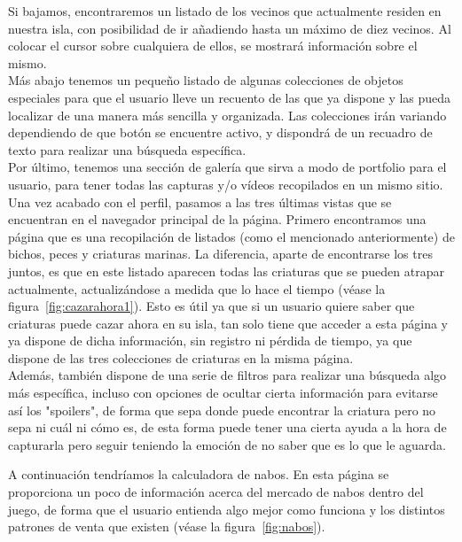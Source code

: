 Si bajamos, encontraremos un listado de los vecinos que actualmente residen en nuestra isla, con posibilidad de ir añadiendo hasta un máximo de diez vecinos. Al colocar el cursor sobre cualquiera de ellos, se mostrará información sobre el mismo.\\

Más abajo tenemos un pequeño listado de algunas colecciones de objetos especiales para que el usuario lleve un recuento de las que ya dispone y las pueda localizar de una manera más sencilla y organizada. Las colecciones irán variando dependiendo de que botón se encuentre activo, y dispondrá de un recuadro de texto para realizar una búsqueda específica.\\

Por último, tenemos una sección de galería que sirva a modo de portfolio para el usuario, para tener todas las capturas y/o vídeos recopilados en un mismo sitio.\\

Una vez acabado con el perfil, pasamos a las tres últimas vistas que se encuentran en el navegador principal de la página. Primero encontramos una página que es una recopilación de listados (como el mencionado anteriormente) de bichos, peces y criaturas marinas. La diferencia, aparte de encontrarse los tres juntos, es que en este listado aparecen todas las criaturas que se pueden atrapar actualmente, actualizándose a medida que lo hace el tiempo {(v\'ease la figura~\ref{fig:cazarahora1})}. Esto es útil ya que si un usuario quiere saber que criaturas puede cazar ahora en su isla, tan solo tiene que acceder a esta página y ya dispone de dicha información, sin registro ni pérdida de tiempo, ya que dispone de las tres colecciones de criaturas en la misma página.\\

Además, también dispone de una serie de filtros para realizar una búsqueda algo más específica, incluso con opciones de ocultar cierta información para evitarse así los "spoilers", de forma que sepa donde puede encontrar la criatura pero no sepa ni cuál ni cómo es, de esta forma puede tener una cierta ayuda a la hora de capturarla pero seguir teniendo la emoción de no saber que es lo que le aguarda.\\



A continuación tendríamos la calculadora de nabos. En esta página se proporciona un poco de información acerca del mercado de nabos dentro del juego, de forma que el usuario entienda algo mejor como funciona y los distintos patrones de venta que existen {(v\'ease la figura~\ref{fig:nabos})}.\\

